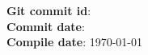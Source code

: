 \documentclass{article}
\begin{document}
\begin{minipage}{0.8\textwidth}
    \textbf{Git commit id}: \textsf{}\\
    \textbf{Commit date}:  \\
    \textbf{Compile date}: \today
\end{minipage}
\end{document}
